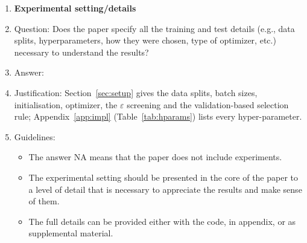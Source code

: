 \documentclass{article}
\begin{document}
\begin{enumerate}
\item {\bf Experimental setting/details}
    \item[] Question: Does the paper specify all the training and test details (e.g., data splits, hyperparameters, how they were chosen, type of optimizer, etc.) necessary to understand the results?
    \item[] Answer: \answerYes{}
    \item[] Justification: Section~\ref{sec:setup} gives the data splits, batch sizes, initialisation, optimizer, the $\varepsilon$ screening and the validation-based selection rule; Appendix~\ref{app:impl} (Table~\ref{tab:hparams}) lists every hyper-parameter.
    \item[] Guidelines:
    \begin{itemize}
        \item The answer NA means that the paper does not include experiments.
        \item The experimental setting should be presented in the core of the paper to a level of detail that is necessary to appreciate the results and make sense of them.
        \item The full details can be provided either with the code, in appendix, or as supplemental material.
    \end{itemize}


\end{enumerate}
\end{document}

